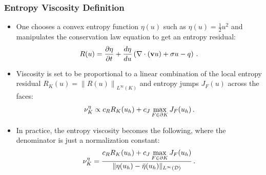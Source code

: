 \begin{frame}
\frametitle{Entropy Viscosity Definition}

\begin{itemize}
   \item One chooses a convex entropy function $\eta(u)$ such
   as $\eta(u)=\frac{1}{2}u^2$ and manipulates the
   conservation law equation to get an entropy residual:
   \begin{equation}
      R(u) = \frac{\partial \eta}{\partial t}
      + \frac{d\eta}{du}\left(\nabla\cdot(\mathbf{v}u)
      + \sigma u 
      - q \right) \,.
   \end{equation}
   \item Viscosity is set to be proportional to a linear combination
      of the local entropy residual $R_K(u) = \left\|R(u)\right\|_{L^\infty(K)}$
      and entropy jumps $J_F(u)$ across the faces:
      \begin{equation}
         \nu^{\eta}_K \propto c_R R_K(u_h)
         + c_J\max\limits_{F\in\partial K}J_F(u_h) \,.
      \end{equation}
   \item In practice, the entropy viscosity becomes the following, where the
      denominator is just a normalization constant:
      \begin{equation}
         \nu^{\eta}_K = \frac{c_R R_K(u_h)
         + c_J\max\limits_{F\in\partial K}J_F(u_h)}
         {\|\eta(u_h)-\bar{\eta}(u_h)\|_{L^\infty(\mathcal{D})}} \,.
      \end{equation}
\end{itemize}
   
\end{frame}
